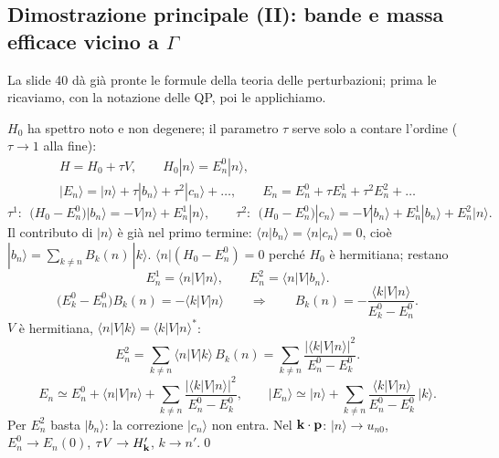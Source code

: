 \documentclass[11pt,a4paper]{article}
\begin{document}
\subsection{Dimostrazione principale (II): bande e massa efficace vicino a $\Gamma$}\label{sec:kpmassa}
La slide 40 dà già pronte le formule della teoria delle perturbazioni; prima le ricaviamo, con la notazione delle QP, poi le applichiamo.
\begin{approfondimento}
$H_0$ ha spettro noto e non degenere; il parametro $\tau$ serve solo a contare l'ordine ($\tau\to1$ alla fine):
\begin{gather*}
H=H_0+\tau V,\qquad H_0|n\rangle=E^0_n|n\rangle,\\
|E_n\rangle=|n\rangle+\tau|b_n\rangle+\tau^2|c_n\rangle+\dots,\qquad E_n=E^0_n+\tau E^1_n+\tau^2E^2_n+\dots
\end{gather*}
\[
\tau^1:\ \ \bigl(H_0-E^0_n\bigr)|b_n\rangle=-V|n\rangle+E^1_n|n\rangle,\qquad
\tau^2:\ \ \bigl(H_0-E^0_n\bigr)|c_n\rangle=-V|b_n\rangle+E^1_n|b_n\rangle+E^2_n|n\rangle .
\]
Il contributo di $|n\rangle$ è già nel primo termine: $\langle n|b_n\rangle=\langle n|c_n\rangle=0$, cioè $|b_n\rangle=\sum_{k\ne n}B_k(n)\,|k\rangle$.
$\langle n|(H_0-E^0_n)=0$ perché $H_0$ è hermitiana; restano
\[
E^1_n=\langle n|V|n\rangle,\qquad E^2_n=\langle n|V|b_n\rangle .
\]
\[
\bigl(E^0_k-E^0_n\bigr)B_k(n)=-\langle k|V|n\rangle\qquad\Longrightarrow\qquad B_k(n)=-\frac{\langle k|V|n\rangle}{E^0_k-E^0_n}.
\]
$V$ è hermitiana, $\langle n|V|k\rangle=\langle k|V|n\rangle^*$:
\[
E^2_n=\sum_{k\ne n}\langle n|V|k\rangle\,B_k(n)=\sum_{k\ne n}\frac{|\langle k|V|n\rangle|^2}{E^0_n-E^0_k}.
\]
\[
E_n\simeq E^0_n+\langle n|V|n\rangle+\sum_{k\ne n}\frac{|\langle k|V|n\rangle|^2}{E^0_n-E^0_k},\qquad
|E_n\rangle\simeq|n\rangle+\sum_{k\ne n}\frac{\langle k|V|n\rangle}{E^0_n-E^0_k}\,|k\rangle .
\]
Per $E^2_n$ basta $|b_n\rangle$: la correzione $|c_n\rangle$ non entra. Nel $\mathbf k\cdot\mathbf p$: $|n\rangle\to u_{n0}$, $E^0_n\to E_n(0)$, $\tau V\to H'_{\mathbf k}$,
$k\to n'$.\qed
\end{approfondimento}
\end{document}
